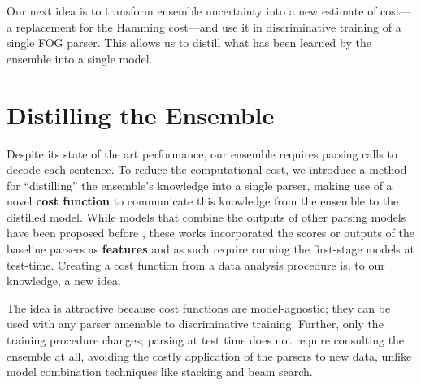 \documentclass[11pt,letterpaper]{article}
\newcommand{\ignore}[1]{}
\newcommand{\cjd}[1]{\textcolor{cyan}{\ignore{{\textbf{[#1 --\textsc{cjd}]}}}}}
\begin{document}







Our next idea is to transform ensemble uncertainty into a new estimate of cost---a replacement for the Hamming cost---and use it in discriminative training of a single FOG parser.  This allows us to distill what has been learned by the ensemble into a single model.








\section{Distilling the Ensemble} \label{sec:distillation}
Despite its state of the art performance, our ensemble requires  parsing calls to decode each sentence.  To reduce the computational cost, we introduce a method for
``distilling'' the ensemble's knowledge into a single parser, making use of a novel \textbf{cost function} to communicate this knowledge from the ensemble to the distilled model.
While models that combine the outputs of other parsing models have been proposed before \cite[\emph{inter alia}]{stacking,NivreIGA08,combine_beam_search}, these works incorporated the scores or outputs of the baseline parsers as \textbf{features} and as such require running the first-stage models at test-time.\cjd{there was way too much detail that was interrupting the exposition of the new idea here, so i cut some stuff} 
Creating a cost function from a data analysis procedure is, to our knowledge, a new idea. 

The idea is attractive because cost functions are model-agnostic; they can be used with any parser amenable to discriminative training.  Further, only the training procedure changes; parsing at test time does not require consulting the ensemble at all, avoiding the costly application of the  parsers to new data, unlike model combination techniques like stacking and beam search.
\end{document}
